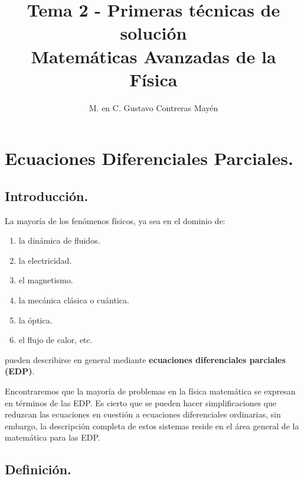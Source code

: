 \documentclass[12pt]{article}
\title{Tema 2 - Primeras técnicas de solución \\[0.3em]  \large{Matemáticas Avanzadas de la Física}\vspace{-3ex}}
\author{M. en C. Gustavo Contreras Mayén}
\date{ }
\numberwithin{equation}{section}
\begin{document}
\vspace{-4cm}
\maketitle
\fontsize{14}{14}\selectfont
\tableofcontents
\newpage

\section{Ecuaciones Diferenciales Parciales.}

\subsection{Introducción.}

La mayoría de los fenómenos físicos, ya sea en el dominio de:
\begin{enumerate}
\item la dinámica de fluidos.
\item la electricidad.
\item el magnetismo.
\item la mecánica clásica o cuántica.
\item la óptica.
\item el flujo de calor, etc.
\end{enumerate}
pueden describirse en general mediante \textbf{ecuaciones diferenciales parciales (EDP)}.

Encontraremos que la mayoría de problemas en la física matemática se expresan en términos de las EDP. Es cierto que se pueden hacer simplificaciones que reduzcan las ecuaciones en cuestión a ecuaciones diferenciales ordinarias, sin embargo, la descripción completa de estos sistemas reside en el área general de la matemática para las EDP.

\subsection{Definición.}
\end{document}
